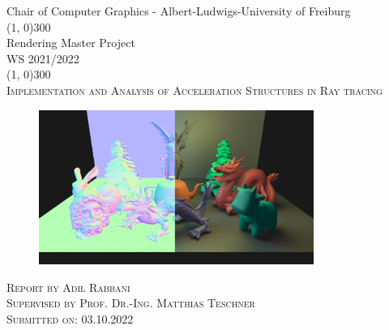 \documentclass[11pt,a4paper]{article}
\begin{document}

\begin{titlepage}

	\begin{center}
	Chair of Computer Graphics - Albert-Ludwigs-University of Freiburg \\
	\line(1, 0){300}\\
	[0.25in]
	\huge{Rendering Master Project \\
					   WS 2021/2022} \\
	\line(1, 0){300}\\
	[0.75in]
	\textsc{\LARGE Implementation and Analysis of Acceleration Structures in Ray tracing}\\
	
	\begin{figure}[H]
		\centering
		\captionsetup{justification=centering,margin=2cm}
		\includegraphics[width=0.8\textwidth]{cover_image}
	\end{figure}
	
	\textsc{\Large Report by Adil Rabbani \\ Supervised by Prof. Dr.-Ing. Matthias Teschner\\}
	\textsc{\large Submitted on: 03.10.2022}

	\end{center}

\end{titlepage}
\end{document}
